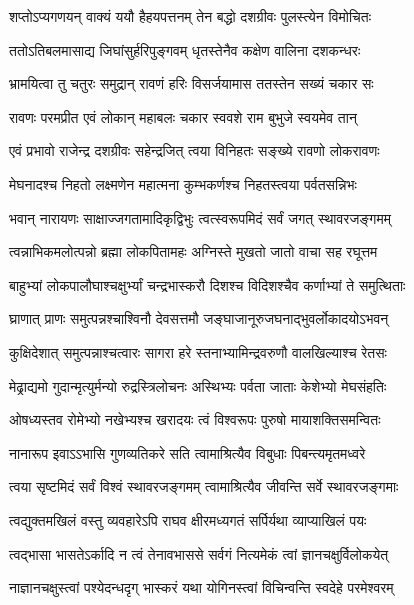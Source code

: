 \twolineshloka
{शप्तोऽप्यगणयन् वाक्यं ययौ हैहयपत्तनम्}
{तेन बद्धो दशग्रीवः पुलस्त्येन विमोचितः} %

\twolineshloka
{ततोऽतिबलमासाद्य जिघांसुर्हरिपुङ्गवम्}
{धृतस्तेनैव कक्षेण वालिना दशकन्धरः} %

\twolineshloka
{भ्रामयित्वा तु चतुरः समुद्रान् रावणं हरिः}
{विसर्जयामास ततस्तेन सख्यं चकार सः} %

\twolineshloka
{रावणः परमप्रीत एवं लोकान् महाबलः}
{चकार स्ववशे राम बुभुजे स्वयमेव तान्} %

\twolineshloka
{एवं प्रभावो राजेन्द्र दशग्रीवः सहेन्द्रजित्}
{त्वया विनिहतः सङ्ख्ये रावणो लोकरावणः} %

\twolineshloka
{मेघनादश्च निहतो लक्ष्मणेन महात्मना}
{कुम्भकर्णश्च निहतस्त्वया पर्वतसन्निभः} %

\twolineshloka
{भवान् नारायणः साक्षाज्जगतामादिकृद्विभुः}
{त्वत्स्वरूपमिदं सर्वं जगत् स्थावरजङ्गमम्} %

\twolineshloka
{त्वन्नाभिकमलोत्पन्नो ब्रह्मा लोकपितामहः}
{अग्निस्ते मुखतो जातो वाचा सह रघूत्तम} %

\twolineshloka
{बाहुभ्यां लोकपालौघाश्चक्षुर्भ्यां चन्द्रभास्करौ}
{दिशश्च विदिशश्चैव कर्णाभ्यां ते समुत्थिताः} %

\twolineshloka
{घ्राणात् प्राणः समुत्पन्नश्चाश्विनौ देवसत्तमौ}
{जङ्घाजानूरुजघनाद्भुवर्लोकादयोऽभवन्} %

\twolineshloka
{कुक्षिदेशात् समुत्पन्नाश्चत्वारः सागरा हरे}
{स्तनाभ्यामिन्द्रवरुणौ वालखिल्याश्च रेतसः} %

\twolineshloka
{मेढ्राद्यमो गुदान्मृत्युर्मन्यो रुद्रस्त्रिलोचनः}
{अस्थिभ्यः पर्वता जाताः केशेभ्यो मेघसंहतिः} %

\twolineshloka
{ओषध्यस्तव रोमेभ्यो नखेभ्यश्च खरादयः}
{त्वं विश्वरूपः पुरुषो मायाशक्तिसमन्वितः} %

\twolineshloka
{नानारूप इवाऽऽभासि गुणव्यतिकरे सति}
{त्वामाश्रित्यैव विबुधाः पिबन्त्यमृतमध्वरे} %

\twolineshloka
{त्वया सृष्टमिदं सर्वं विश्वं स्थावरजङ्गमम्}
{त्वामाश्रित्यैव जीवन्ति सर्वे स्थावरजङ्गमाः} %

\twolineshloka
{त्वद्युक्तमखिलं वस्तु व्यवहारेऽपि राघव}
{क्षीरमध्यगतं सर्पिर्यथा व्याप्याखिलं पयः} %

\twolineshloka
{त्वद्भासा भासतेऽर्कादि न त्वं तेनावभाससे}
{सर्वगं नित्यमेकं त्वां ज्ञानचक्षुर्विलोकयेत्} %

\twolineshloka
{नाज्ञानचक्षुस्त्वां पश्येदन्धदृग् भास्करं यथा}
{योगिनस्त्वां विचिन्वन्ति स्वदेहे परमेश्वरम्} %

